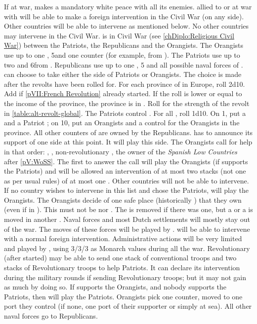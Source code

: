 \phevnt
\aparag If at war, \HOL makes a mandatory white peace with all its enemies.
\bparag \MAJ allied to or at war with \HOL will be able to make a foreign
intervention in the Civil War (on any side).
\bparag Other countries will be able to intervene as mentioned below. No other
countries may intervene in the Civil War.
\aparag \HOL is in Civil War (see \ref{chDiplo:Religious Civil War}) between
the Patriots, the Republicans and the Orangists.
\bparag The Orangists use up to one \ARMY, 5\LDND and one \FLEET counter (for
example, from \paysroyalistes).
\bparag The Patriots use up to two \ARMY and 6\LD from \paysrebelles.
\bparag Republicans use up to one \ARMY, 5 \LDND and all possible naval forces
of \paysHollande.
\bparag \HOL can choose to take either the side of Patriots or Orangists. The
choice is made after the revolts have been rolled for.
 For each province of \HOL in Europe, roll
2d10. Add  if \ref{pVII:French Revolution} already started. If the
roll is lower or equal to the income of the province, the province is in
\REVOLT. Roll for the strength of the revolt in \ref{table:alt-revolt-global}.
\bparag The Patriots control \provinceHolland.
\aparag For all \COL, roll 1d10. On 1, put a \REVOLT\faceplus and a Patriot
\LD; on 10, put an Orangists \LD and a control for the Orangists in the
province. All other \ROTW counters of \HOL are owned by the Republicans.
\bparag \HOL has to announce its support of one side at this point. It will
play this side.
 The Orangists call for help in that order: \PRU,
\SUE, non-revolutionary \FRA, the owner of the \emph{Spanish Low Countries}
after \ref{pV:WoSS}.
\bparag The first to answer the call will play the Orangists (if \HOL supports
the Patriots) and will be allowed an intervention of at most two stacks (not
one as per usual rules) of at most one \ARMY\faceplus.
\bparag Other countries will not be able to intervene.
\bparag If no country wishes to intervene in this list and \HOL chose the
Patriots, \PRU will play the Orangists.
\bparag The Orangists decide of one safe place (historically
\provinceGelderland) that they own (even if in \REVOLT). This must not be
\provinceHolland nor \provinceUtrecht. The \REVOLT is removed if there was
one, but a \LD or a \LeaderG is moved in another \REVOLT.
 Naval forces and most \ROTW Dutch settlements
will mostly stay out of the war. The moves of these forces will be played by
\ENG.
\bparag \ENG will be able to intervene with a normal foreign intervention.
\bparag Administrative actions will be very limited and played by \HOL, using
3/3/3 as Monarch values during all the war.
 Revolutionary \FRA (after
 started) may be able to send one stack of
conventional troops and two stacks of Revolutionary troops to help
Patriots. It can declare its intervention during the military rounds if
sending Revolutionary troops; but it may not gain as much by doing so.
\bparag If \HOL supports the Orangists, and nobody supports the Patriots, then
\TUR will play the Patriots.
 Orangists pick one \FLEET counter, moved to one port
they control (if none, one port of their supporter or simply at sea). All
other naval forces go to Republicans.

